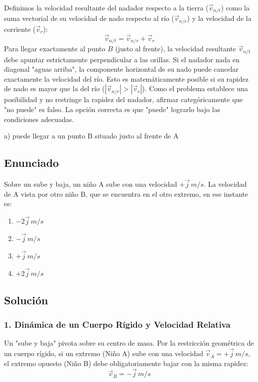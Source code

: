 \documentclass[12pt, a4paper]{article}
\begin{document}
Definimos la velocidad resultante del nadador respecto a la tierra ($\vec{v}_{n/t}$) como la suma vectorial de su velocidad de nado respecto al río ($\vec{v}_{n/r}$) y la velocidad de la corriente ($\vec{v}_r$):
$$ \vec{v}_{n/t} = \vec{v}_{n/r} + \vec{v}_r $$
Para llegar exactamente al punto $B$ (justo al frente), la velocidad resultante $\vec{v}_{n/t}$ debe apuntar estrictamente perpendicular a las orillas. 
Si el nadador nada en diagonal "aguas arriba", la componente horizontal de su nado puede cancelar exactamente la velocidad del río. Esto es matemáticamente posible si su rapidez de nado es mayor que la del río ($|\vec{v}_{n/r}| > |\vec{v}_r|$). 
Como el problema establece una posibilidad y no restringe la rapidez del nadador, afirmar categóricamente que "no puede" es falso. La opción correcta es que "puede" lograrlo bajo las condiciones adecuadas.

\begin{tcolorbox}[colback=green!5!white, colframe=green!50!black, title=Respuesta Final]
\centering \Large a) puede llegar a un punto B situado justo al frente de A
\end{tcolorbox}

\newpage

\subsection*{Enunciado}
Sobre un sube y baja, un niño A sube con una velocidad $+\vec{j} \,\si{m/s}$. La velocidad de A vista por otro niño B, que se encuentra en el otro extremo, en ese instante es:
\begin{enumerate}[label=\alph*)]
    \item $-2\vec{j} \,\si{m/s}$
    \item $-\vec{j} \,\si{m/s}$
    \item $+\vec{j} \,\si{m/s}$
    \item $+2\vec{j} \,\si{m/s}$
\end{enumerate}

\subsection*{Solución}

\subsubsection*{1. Dinámica de un Cuerpo Rígido y Velocidad Relativa}
Un "sube y baja" pivota sobre su centro de masa. Por la restricción geométrica de un cuerpo rígido, si un extremo (Niño A) sube con una velocidad $\vec{v}_A = +\vec{j} \,\si{m/s}$, el extremo opuesto (Niño B) debe obligatoriamente bajar con la misma rapidez:
$$ \vec{v}_B = -\vec{j} \,\si{m/s} $$
\end{document}
